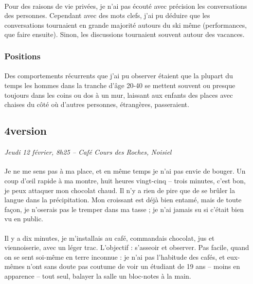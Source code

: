 \paragraph{}
Pour des raisons de vie privées, je n'ai pas écouté avec précision les
conversations des personnes. Cependant avec des mots clefs, j'ai pu déduire
que les conversations tournaient en grande majorité autours du ski même
(performances, que faire ensuite). Sinon, les discussions tournaient souvent
autour des vacances.

\subsubsection{Positions}
\paragraph{}
Des comportements récurrents que j'ai pu observer étaient que la plupart du
temps les hommes dans la tranche d'âge 20-40 se mettent souvent ou presque
toujours dans les coins ou dos à un mur, laissant aux enfants des places avec
chaises du côté où d'autres personnes, étrangères, passeraient.

\subsection{4\ieme version}
\paragraph{}
\emph{Jeudi 12 février, 8h25 – Café Cours des Roches, Noisiel}

\paragraph{}
Je ne me sens pas à ma place, et en même temps je n’ai pas envie de bouger. Un
coup d’œil rapide à ma montre, huit heures vingt-cinq – trois minutes, c’est
bon, je peux attaquer mon chocolat chaud. Il n’y a rien de pire que de se
brûler la langue dans la précipitation. Mon croissant est déjà bien entamé,
mais de toute façon, je n’oserais pas le tremper dans ma tasse ; je n’ai jamais
su si c’était bien vu en public.

\paragraph{}
Il y a dix minutes, je m’installais au café, commandais chocolat, jus et
viennoiserie, avec un léger trac. L’objectif : s’asseoir et observer. Pas
facile, quand on se sent soi-même en terre inconnue : je n’ai pas l’habitude
des cafés, et eux-mêmes n’ont sans doute pas coutume de voir un étudiant de 19
ans – moins en apparence – tout seul, balayer la salle un bloc-notes à la main.

